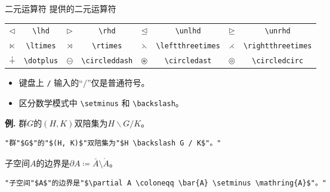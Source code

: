 \documentclass[mathserif]{beamer}
\newcommand{\codegreen}[1]{\textcolor{codegreen}{#1}}
\newenvironment{instance}{\zihao{-5}\textbf{\songti \codegreen{例.}}}{\hfill\par}
\begin{document}
\begin{frame}[fragile]{二元运算符}{\AmS{} 提供的二元运算符}
\begin{table}[H]
\centering
\begin{tabular}{cc|cc|cc|cc}
	\toprule
	$\lhd$ & \lstinline'\lhd' & $\rhd$ & \lstinline'\rhd' & $\unlhd$ & \lstinline'\unlhd' & $\unrhd$ & \lstinline'\unrhd' \\
	$\ltimes$ & \lstinline'\ltimes' & $\rtimes$ & \lstinline'\rtimes' & $\leftthreetimes$ & \lstinline'\leftthreetimes' & $\rightthreetimes$ & \lstinline'\rightthreetimes' \\
	$\dotplus$ & \lstinline'\dotplus' & $\circleddash$ & \lstinline'\circleddash' & $\circledast$ & \lstinline'\circledast' & $\circledcirc$ & \lstinline'\circledcirc' \\
	\bottomrule
\end{tabular}
\end{table}
\begin{itemize}

\item 键盘上 \lstinline'/' 输入的``$/$''仅是普通符号。

\item 区分数学模式中 \lstinline'\setminus' 和 \lstinline'\backslash'。

\end{itemize}
\begin{instance}
	群$G$的$(H, K)$双陪集为$H \backslash G / K$。
\begin{lstlisting}[numbers=none]
"群"$G$"的"$(H, K)$"双陪集为"$H \backslash G / K$"。"
\end{lstlisting}
子空间$A$的边界是$\partial A \coloneqq \bar{A} \setminus \mathring{A}$。
\begin{lstlisting}[numbers=none]
"子空间"$A$"的边界是"$\partial A \coloneqq \bar{A} \setminus \mathring{A}$"。"
\end{lstlisting}
\end{instance}
\end{frame}
\end{document}
